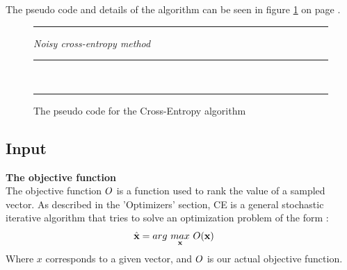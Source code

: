 The pseudo code and details of the algorithm can be seen in figure
\ref{fig:ceCode} on page \pageref{fig:ceCode}.

\begin{figure}[H]
\hrule
\vspace{0.2cm}
{\centering  \textit{Noisy cross-entropy method}}
\vspace{0.2cm}
\hrule
\begin{algorithmic}
\\

\Loop
{}
\EndLoop
\end{algorithmic}
\hrule
\caption{The pseudo code for the Cross-Entropy algorithm \label{fig:ceCode}}
\end{figure}

\subsection{Input}

\textbf{The objective function \label{CEObjective}} \\
The objective function $O$ is a 
function used to rank the value of a sampled vector.
As described in the 'Optimizers' section, CE is a general stochastic 
iterative algorithm that tries to solve an optimization problem of 
the form \citep{thiery:09}:
\begin{align*}
\hat{\textbf{\individual }} &= 
arg \  \underset{\textbf{\individual }}{max} \  
\fitnessFunction (\textbf{\individual }) \ 
\end{align*}
Where $x$ corresponds to a given vector, 
and $O$ is our actual objective function. 
\\

